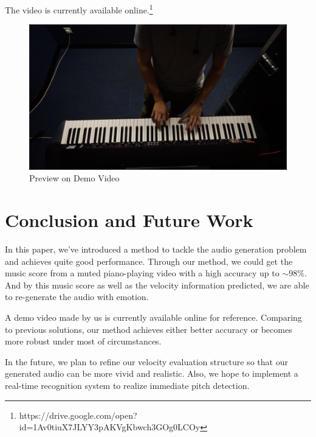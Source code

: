 \documentclass[10pt,twocolumn,letterpaper]{article}
\begin{document}
The video is currently available online.\footnote{https://drive.google.com/open?id=1Av0tiuX7JLYY3pAKVgKbwch3GOg0LCOy}

\begin{figure}[h!]
   \centering
   \includegraphics[width=\linewidth]{fig/video.png}
   \caption{Preview on Demo Video}
\end{figure}

\section{Conclusion and Future Work}

In this paper, we've introduced a method to tackle the audio generation problem and achieves quite good performance.
Through our method, we could get the music score from a muted piano-playing video with a high accuracy up to \(\sim 98\%\).
And by this music score as well as the velocity information predicted, we are able to re-generate the audio with emotion.

A demo video made by us is currently available online for reference.
Comparing to previous solutions, our method achieves either better accuracy or becomes more robust under most of circumstances.

In the future, we plan to refine our velocity evaluation structure so that our generated audio can be more vivid and realistic. Also, we hope to implement a real-time recognition system to realize immediate pitch detection.


{\small


}
\end{document}
